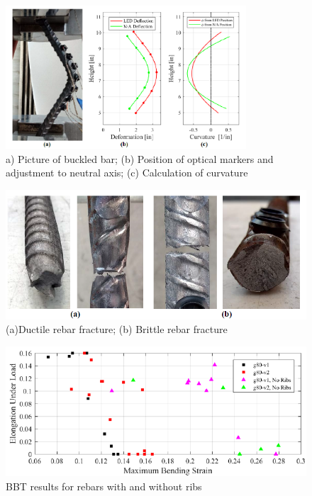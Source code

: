 \begin{figure}[htbp]
    \centering
    \includegraphics[width=0.8\textwidth]{Chapter-3/figs/BBT_Curvature}
    \caption{a) Picture of buckled bar; (b) Position of optical markers and adjustment to neutral axis; (c) Calculation of curvature \cite{Barcley2018}}
    \label{fig:BBT_Curvature}
\end{figure}
\begin{figure}
    \centering
    \includegraphics[width=1.0\textwidth]{Chapter-3/figs/BBT_Ductile_vs_Brittle}
    \caption{(a)Ductile rebar fracture; (b) Brittle rebar fracture \cite{Barcley2018}}
    \label{fig:BBT_DuctileBrittle}
\end{figure}
\begin{figure}[htbp]
    \centering
    \includegraphics[width=1.0\textwidth]{Chapter-3/figs/BBT_MaxBendignStrain}
    \caption{BBT results for rebars with and without ribs \cite{Barcley2018}}
    \label{fig:BBT_MaxBendingStrain}
\end{figure}


